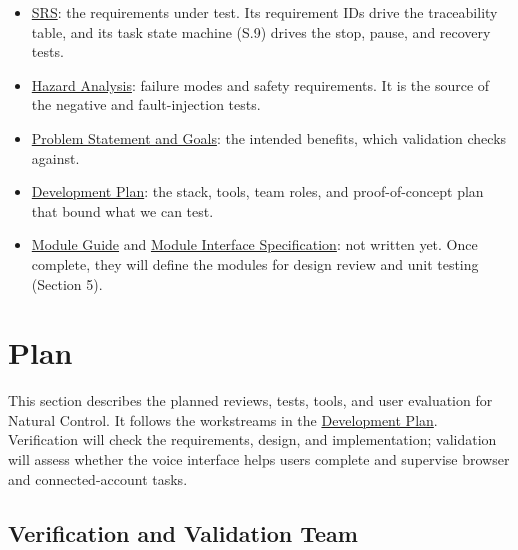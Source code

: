\documentclass[12pt, titlepage]{article}
\begin{document}
\begin{itemize}
  \item \href{https://github.com/NaturalControl/natural-control/blob/main/docs/SRS-Meyer/SRS.tex}{SRS}:
  the requirements under test. Its requirement IDs drive the traceability table,
  and its task state machine (S.9) drives the stop, pause, and recovery tests.
  \item \href{https://github.com/NaturalControl/natural-control/blob/main/docs/HazardAnalysis/HazardAnalysis.tex}{Hazard Analysis}:
  failure modes and safety requirements. It is the source of the negative and
  fault-injection tests.
  \item \href{https://github.com/NaturalControl/natural-control/blob/main/docs/ProblemStatementAndGoals/ProblemStatement.tex}{Problem Statement and Goals}:
  the intended benefits, which validation checks against.
  \item \href{https://github.com/NaturalControl/natural-control/blob/main/docs/DevelopmentPlan/DevelopmentPlan.tex}{Development Plan}:
  the stack, tools, team roles, and proof-of-concept plan that bound what we can
  test.
  \item \href{https://github.com/NaturalControl/natural-control/blob/main/docs/Design/SoftArchitecture/MG.tex}{Module Guide} and
  \href{https://github.com/NaturalControl/natural-control/blob/main/docs/Design/SoftDetailedDes/MIS.tex}{Module Interface Specification}:
  not written yet. Once complete, they will define the modules for design review
  and unit testing (Section 5).
\end{itemize}

\section{Plan}

This section describes the planned reviews, tests, tools, and user evaluation
for Natural Control. It follows the workstreams in the
\href{https://github.com/NaturalControl/natural-control/blob/main/docs/DevelopmentPlan/DevelopmentPlan.tex}{Development Plan}.
Verification will check the requirements, design, and implementation;
validation will assess whether the voice interface helps users complete and
supervise browser and connected-account tasks.

\subsection{Verification and Validation Team}
\end{document}
